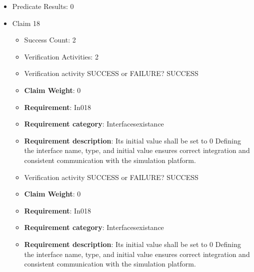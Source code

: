 \documentclass{article}
\begin{document}
\begin{itemize}
\begin{itemize}
					\item Verification activity SUCCESS or FAILURE? SUCCESS
					\item \textbf{Claim Weight}: 0
						\item \textbf{Requirement}: In017 
						\item \textbf{Requirement category}: Interfacesexistance 
						\item \textbf{Requirement description}: Its initial value shall be set to 0 Defining the interface name, type, and initial value ensures correct integration and consistent communication with the simulation platform.
					
				\end{itemize}
				
									    
				\item Predicate Results: 0

  				  \item Claim 18
				\begin{itemize}
			    	\item Success Count: 2 
			    	\item Verification Activities: 2
					\item Verification activity SUCCESS or FAILURE? SUCCESS
					\item \textbf{Claim Weight}: 0
						\item \textbf{Requirement}: In018 
						\item \textbf{Requirement category}: Interfacesexistance 
						\item \textbf{Requirement description}: Its initial value shall be set to 0 Defining the interface name, type, and initial value ensures correct integration and consistent communication with the simulation platform.
					
					\item Verification activity SUCCESS or FAILURE? SUCCESS
					\item \textbf{Claim Weight}: 0
						\item \textbf{Requirement}: In018 
						\item \textbf{Requirement category}: Interfacesexistance 
						\item \textbf{Requirement description}: Its initial value shall be set to 0 Defining the interface name, type, and initial value ensures correct integration and consistent communication with the simulation platform.
					
				\end{itemize}
				

\end{itemize}
\end{document}
